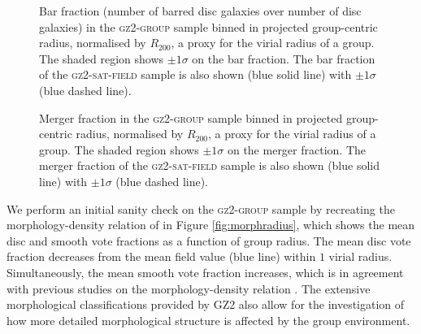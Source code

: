 \documentclass[useAMS,usenatbib]{mn2e}
\begin{document}
\begin{figure}
\caption[Bar fraction with group radius in the \textsc{gz2-group} sample]{Bar fraction (number of barred disc galaxies over number of disc galaxies) in the \textsc{gz2-group} sample binned in projected group-centric radius, normalised by $R_{200}$, a proxy for the virial radius of a group. The shaded region shows $\pm1\sigma$ on the bar fraction. The bar fraction of the \textsc{gz2-sat-field} sample is also shown (blue solid line) with $\pm1\sigma$ (blue dashed line).}
\label{fig:barradius}
\end{figure}

\begin{figure}
\caption[Merger fraction with group radius in the \textsc{gz2-group} sample]{Merger fraction in the \textsc{gz2-group} sample binned in projected group-centric radius, normalised by $R_{200}$, a proxy for the virial radius of a group. The shaded region shows $\pm1\sigma$ on the merger fraction. The merger fraction of the \textsc{gz2-sat-field} sample is also shown (blue solid line) with $\pm1\sigma$ (blue dashed line).}
\label{fig:mergerradius}
\end{figure}


We perform an initial sanity check on the \textsc{gz2-group} sample by recreating the morphology-density relation of \citet{dressler80} in Figure \ref{fig:morphradius}, which shows the mean disc and smooth vote fractions as a function of group radius. The mean disc vote fraction decreases from the mean field value (blue line) within $1$ virial radius. Simultaneously, the mean smooth vote fraction increases, which is in agreement with previous studies on the morphology-density relation \citep{dressler80, smail97, poggianti99, postman05, Bamford09}. The extensive morphological classifications provided by GZ2 also allow for the investigation of how more detailed morphological structure is affected by the group environment.  
\end{document}
